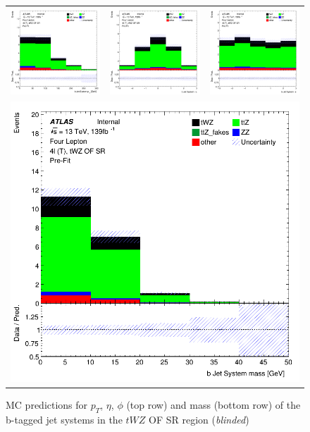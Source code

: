 \begin{figure}[htbp]
\centering
  \begin{tabular}{ccc}

    \includegraphics[width=.2\textwidth]{figures/PreFitPlots/lep4_tWZ_4T_OF_bJet_sys_Pt}&
    \includegraphics[width=.2\textwidth]{figures/PreFitPlots/lep4_tWZ_4T_OF_bJet_sys_Eta} &
    \includegraphics[width=.2\textwidth]{figures/PreFitPlots/lep4_tWZ_4T_OF_bJet_sys_Phi} \\
    \multicolumn{3}{c}{\includegraphics[width=.2\textwidth]{figures/PreFitPlots/lep4_tWZ_4T_OF_bJet_sys_mass}}

  \end{tabular}
  \caption{MC predictions for $p_{T}$, $\eta$, $\phi$ (top row) and mass (bottom row) of the b-tagged jet systems in the $tWZ$ OF SR region (\textit{blinded})}
  \label{fig:4lep-OF-SR-bjet-sys-Plots}
\end{figure}
\clearpage

